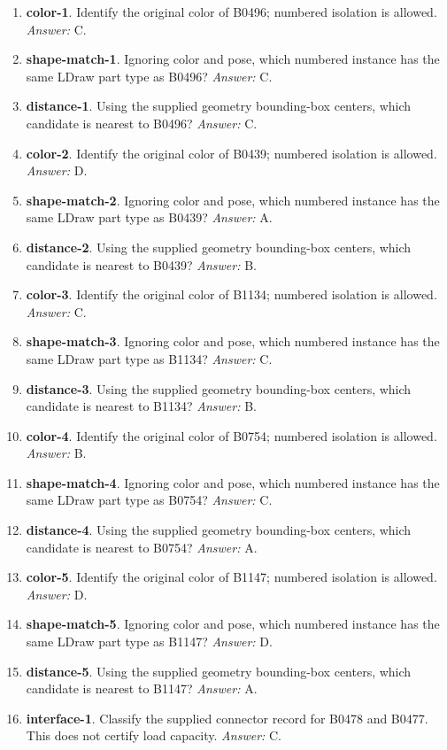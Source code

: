 \begin{enumerate}
\item \textbf{color-1}. Identify the original color of B0496; numbered isolation is allowed. \textit{Answer:} C.
\item \textbf{shape-match-1}. Ignoring color and pose, which numbered instance has the same LDraw part type as B0496? \textit{Answer:} C.
\item \textbf{distance-1}. Using the supplied geometry bounding-box centers, which candidate is nearest to B0496? \textit{Answer:} C.
\item \textbf{color-2}. Identify the original color of B0439; numbered isolation is allowed. \textit{Answer:} D.
\item \textbf{shape-match-2}. Ignoring color and pose, which numbered instance has the same LDraw part type as B0439? \textit{Answer:} A.
\item \textbf{distance-2}. Using the supplied geometry bounding-box centers, which candidate is nearest to B0439? \textit{Answer:} B.
\item \textbf{color-3}. Identify the original color of B1134; numbered isolation is allowed. \textit{Answer:} C.
\item \textbf{shape-match-3}. Ignoring color and pose, which numbered instance has the same LDraw part type as B1134? \textit{Answer:} C.
\item \textbf{distance-3}. Using the supplied geometry bounding-box centers, which candidate is nearest to B1134? \textit{Answer:} B.
\item \textbf{color-4}. Identify the original color of B0754; numbered isolation is allowed. \textit{Answer:} B.
\item \textbf{shape-match-4}. Ignoring color and pose, which numbered instance has the same LDraw part type as B0754? \textit{Answer:} C.
\item \textbf{distance-4}. Using the supplied geometry bounding-box centers, which candidate is nearest to B0754? \textit{Answer:} A.
\item \textbf{color-5}. Identify the original color of B1147; numbered isolation is allowed. \textit{Answer:} D.
\item \textbf{shape-match-5}. Ignoring color and pose, which numbered instance has the same LDraw part type as B1147? \textit{Answer:} D.
\item \textbf{distance-5}. Using the supplied geometry bounding-box centers, which candidate is nearest to B1147? \textit{Answer:} A.
\item \textbf{interface-1}. Classify the supplied connector record for B0478 and B0477. This does not certify load capacity. \textit{Answer:} C.

\end{enumerate}
